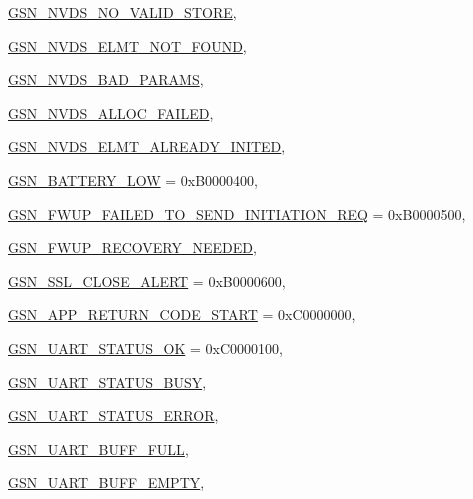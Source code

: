 \begin{DoxyCompactItemize}
\par
\hyperlink{a00659_gga476ae1caf992f8287176b2cc414c8707ae659084f1f26f351daa26577f93bfc03}{GSN\_\-NVDS\_\-NO\_\-VALID\_\-STORE}, 
\par
\hyperlink{a00659_gga476ae1caf992f8287176b2cc414c8707a44c7d2ef1d710f2fe0930ded1a8a93e4}{GSN\_\-NVDS\_\-ELMT\_\-NOT\_\-FOUND}, 
\par
\hyperlink{a00659_gga476ae1caf992f8287176b2cc414c8707a2e8a700dee5ddcc6ecdec80a1ada8eff}{GSN\_\-NVDS\_\-BAD\_\-PARAMS}, 
\par
\hyperlink{a00659_gga476ae1caf992f8287176b2cc414c8707a87b3d3e5582de3a30a79a7221d4f37ef}{GSN\_\-NVDS\_\-ALLOC\_\-FAILED}, 
\par
\hyperlink{a00659_gga476ae1caf992f8287176b2cc414c8707ab05b1be1a92406332c4dcb37495f52aa}{GSN\_\-NVDS\_\-ELMT\_\-ALREADY\_\-INITED}, 
\par
\hyperlink{a00659_gga476ae1caf992f8287176b2cc414c8707a41697e2b124c9f5cb6b603760c5c8d73}{GSN\_\-BATTERY\_\-LOW} =  0xB0000400, 
\par
\hyperlink{a00659_gga476ae1caf992f8287176b2cc414c8707a536840c09ce54ca8f42dd322a65e571d}{GSN\_\-FWUP\_\-FAILED\_\-TO\_\-SEND\_\-INITIATION\_\-REQ} =  0xB0000500, 
\par
\hyperlink{a00659_gga476ae1caf992f8287176b2cc414c8707a51931f93c1276a07391c5211a0a2af83}{GSN\_\-FWUP\_\-RECOVERY\_\-NEEDED}, 
\par
\hyperlink{a00659_gga476ae1caf992f8287176b2cc414c8707a1ae2f602601c58011635de1fa0276394}{GSN\_\-SSL\_\-CLOSE\_\-ALERT} =  0xB0000600, 
\par
\hyperlink{a00659_gga476ae1caf992f8287176b2cc414c8707a1b773f03003e4a584d03028fc62a9ca9}{GSN\_\-APP\_\-RETURN\_\-CODE\_\-START} =  0xC0000000, 
\par
\hyperlink{a00659_gga476ae1caf992f8287176b2cc414c8707ab30124a198f96ecae0ef1bee80cc0130}{GSN\_\-UART\_\-STATUS\_\-OK} =  0xC0000100, 
\par
\hyperlink{a00659_gga476ae1caf992f8287176b2cc414c8707a81c4ae50b1a9af34e521dd80347de5d3}{GSN\_\-UART\_\-STATUS\_\-BUSY}, 
\par
\hyperlink{a00659_gga476ae1caf992f8287176b2cc414c8707a22bc4731bca9188f3d9001b69c349f5c}{GSN\_\-UART\_\-STATUS\_\-ERROR}, 
\par
\hyperlink{a00659_gga476ae1caf992f8287176b2cc414c8707ad3a46887bde88aa698d160c80935838d}{GSN\_\-UART\_\-BUFF\_\-FULL}, 
\par
\hyperlink{a00659_gga476ae1caf992f8287176b2cc414c8707a4d787651d018dcdd087347ded4469a5a}{GSN\_\-UART\_\-BUFF\_\-EMPTY}, 

\end{DoxyCompactItemize}
